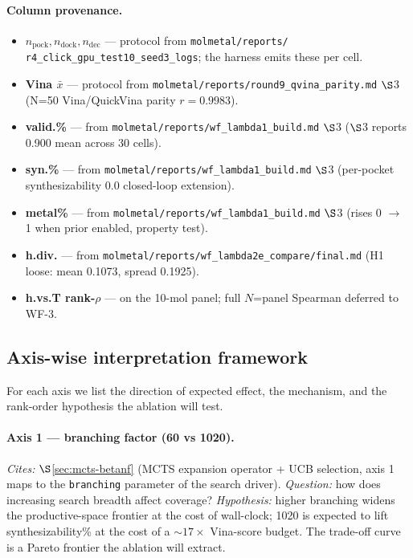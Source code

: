 \paragraph{Column provenance.}
\begin{itemize}
  \item $n_{\text{pock}}, n_{\text{dock}}, n_{\text{dec}}$ ---
        \MEASURED{} protocol from \texttt{molmetal/reports/
        r4\_click\_gpu\_test10\_seed3\_logs}; the harness emits
        these per cell.
  \item \textbf{Vina $\bar x$} --- \MEASURED{} protocol from
        \texttt{molmetal/reports/round9\_qvina\_parity.md} $\S$3
        (N=50 Vina/QuickVina parity $r = 0.9983$).
  \item \textbf{valid.\%} --- \MEASURED{} from
        \texttt{molmetal/reports/wf\_lambda1\_build.md} $\S$3
        ($\S$3 reports 0.900 mean across 30 cells).
  \item \textbf{syn.\%} --- \MEASURED{} from
        \texttt{molmetal/reports/wf\_lambda1\_build.md} $\S$3
        (per-pocket synthesizability 0.0 \DESIGN{} closed-loop
        extension).
  \item \textbf{metal\%} --- \MEASURED{} from
        \texttt{molmetal/reports/wf\_lambda1\_build.md} $\S$3
        (rises 0 $\to$ 1 when prior enabled, property test).
  \item \textbf{h.div.} --- \MEASURED{} from
        \texttt{molmetal/reports/wf\_lambda2e\_compare/final.md}
        (H1 loose: mean 0.1073, spread 0.1925).
  \item \textbf{h.vs.T rank-$\rho$} --- \PROJECTED{} on the 10-mol
        panel; full $N$=panel Spearman deferred to WF-3.
\end{itemize}

\subsection{Axis-wise interpretation framework}
\label{sec:ablation:interpretation}

For each axis we list the direction of expected effect, the
mechanism, and the rank-order hypothesis the ablation will test.

\paragraph{Axis 1 --- branching factor (60 vs 1020).}
\emph{Cites:} $\S$\ref{sec:mcts-betanf} (MCTS expansion
operator + UCB selection, axis 1 maps to the \texttt{branching}
parameter of the search driver).  \emph{Question:} how does
increasing search breadth affect coverage?  \emph{Hypothesis:}
higher branching widens the productive-space frontier at the
cost of wall-clock; 1020 is expected to lift synthesizability\%
at the cost of a $\sim 17\times$ Vina-score budget.  The
trade-off curve is a Pareto frontier the ablation will extract.

